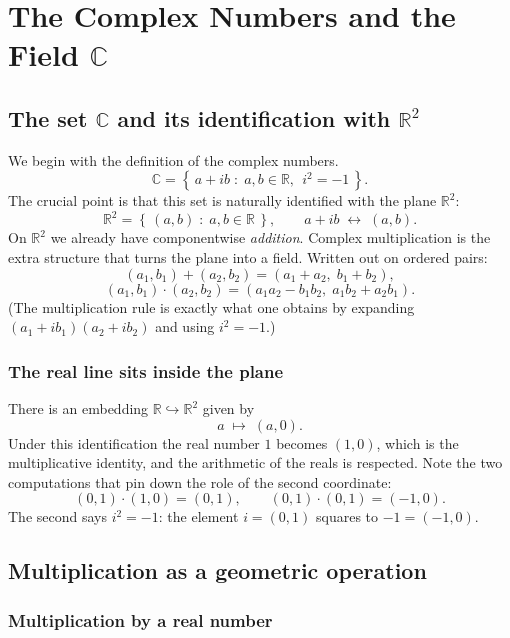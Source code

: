 \documentclass[11pt,openany]{report}
\newcommand{\C}{\mathbb{C}}
\newcommand{\R}{\mathbb{R}}
\newcommand{\set}[1]{\left\{ #1 \right\}}
\begin{document}
\chapter{The Complex Numbers and the Field \texorpdfstring{$\C$}{C}}

\section{The set \texorpdfstring{$\C$}{C} and its identification with \texorpdfstring{$\R^2$}{R2}}

We begin with the definition of the complex numbers.
\[
  \C = \set{\, a+ib \;:\; a,b\in\R,\ \ i^2=-1 \,}.
\]
The crucial point is that this set is naturally identified with the plane $\R^2$:
\[
  \R^2 = \set{\,(a,b) \;:\; a,b\in\R\,}, \qquad a+ib \;\longleftrightarrow\; (a,b).
\]
On $\R^2$ we already have componentwise \emph{addition}. Complex multiplication is
the extra structure that turns the plane into a field. Written out on ordered pairs:
\[
  (a_1,b_1)+(a_2,b_2) = (a_1+a_2,\; b_1+b_2),
\]
\[
  (a_1,b_1)\cdot(a_2,b_2) = (a_1a_2-b_1b_2,\; a_1b_2+a_2b_1).
\]
(The multiplication rule is exactly what one obtains by expanding $(a_1+ib_1)(a_2+ib_2)$ and using $i^2=-1$.)

\subsection{The real line sits inside the plane}

There is an embedding $\R\hookrightarrow \R^2$ given by
\[
  a \;\longmapsto\; (a,0).
\]
Under this identification the real number $1$ becomes $(1,0)$, which is the multiplicative
identity, and the arithmetic of the reals is respected. Note the two computations that
pin down the role of the second coordinate:
\[
  (0,1)\cdot(1,0) = (0,1), \qquad (0,1)\cdot(0,1) = (-1,0).
\]
The second says $i^2=-1$: the element $i=(0,1)$ squares to $-1=(-1,0)$.

\section{Multiplication as a geometric operation}

\subsection{Multiplication by a real number}
\end{document}
